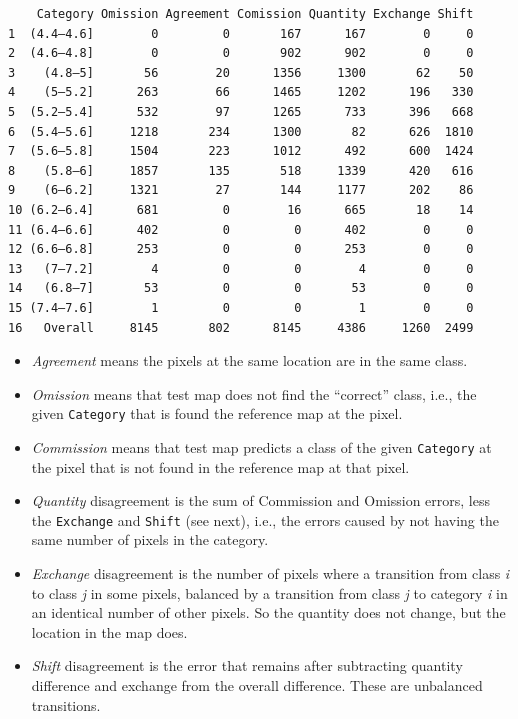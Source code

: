 \documentclass[
  letterpaper,
  DIV=11,
  numbers=noendperiod]{scrartcl}
\providecommand{\tightlist}{%
  \setlength{\itemsep}{0pt}\setlength{\parskip}{0pt}}\usepackage{longtable,booktabs,array}
\begin{document}
\begin{verbatim}
    Category Omission Agreement Comission Quantity Exchange Shift
1  (4.4–4.6]        0         0       167      167        0     0
2  (4.6–4.8]        0         0       902      902        0     0
3    (4.8–5]       56        20      1356     1300       62    50
4    (5–5.2]      263        66      1465     1202      196   330
5  (5.2–5.4]      532        97      1265      733      396   668
6  (5.4–5.6]     1218       234      1300       82      626  1810
7  (5.6–5.8]     1504       223      1012      492      600  1424
8    (5.8–6]     1857       135       518     1339      420   616
9    (6–6.2]     1321        27       144     1177      202    86
10 (6.2–6.4]      681         0        16      665       18    14
11 (6.4–6.6]      402         0         0      402        0     0
12 (6.6–6.8]      253         0         0      253        0     0
13   (7–7.2]        4         0         0        4        0     0
14   (6.8–7]       53         0         0       53        0     0
15 (7.4–7.6]        1         0         0        1        0     0
16   Overall     8145       802      8145     4386     1260  2499
\end{verbatim}

\begin{itemize}
\tightlist
\item
  \emph{Agreement} means the pixels at the same location are in the same
  class.
\item
  \emph{Omission} means that test map does not find the ``correct''
  class, i.e., the given \texttt{Category} that is found the reference
  map at the pixel.
\item
  \emph{Commission} means that test map predicts a class of the given
  \texttt{Category} at the pixel that is not found in the reference map
  at that pixel.
\item
  \emph{Quantity} disagreement is the sum of Commission and Omission
  errors, less the \texttt{Exchange} and \texttt{Shift} (see next),
  i.e., the errors caused by not having the same number of pixels in the
  category.
\item
  \emph{Exchange} disagreement is the number of pixels where a
  transition from class \emph{i} to class \emph{j} in some pixels,
  balanced by a transition from class \emph{j} to category \emph{i} in
  an identical number of other pixels. So the quantity does not change,
  but the location in the map does.
\item
  \emph{Shift} disagreement is the error that remains after subtracting
  quantity difference and exchange from the overall difference. These
  are unbalanced transitions.
\end{itemize}
\end{document}
